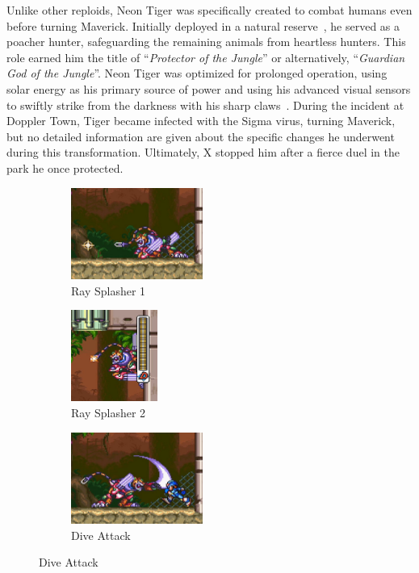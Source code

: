 Unlike other reploids, Neon Tiger was specifically created to combat humans even before turning Maverick. Initially deployed in a natural reserve~\cite{wiki:Neon_tiger}, he served as a poacher hunter, safeguarding the remaining animals from heartless hunters. This role earned him the title of ``\textit{Protector of the Jungle}''\cite{book:MMX_Complete_art} or alternatively, ``\textit{Guardian God of the Jungle}''\cite{wayback:X3_resources}. Neon Tiger was optimized for prolonged operation, using solar energy as his primary source of power and using his advanced visual sensors to swiftly strike from the darkness with his sharp claws~\cite{wayback:X3_resources,Xcoll1:Manual_X3}. During the incident at Doppler Town, Tiger became infected with the Sigma virus, turning Maverick, but  no detailed information are given about the specific changes he underwent during this transformation. Ultimately, X stopped him after a fierce duel in the park he once protected.
\begin{figure}[htp]
	\centering
	\begin{subfigure}{.4\linewidth}
		\centering
		\includegraphics[height=3cm]{figures/X3/Neon_tiger/tiger_ray.jpg}
		\caption{Ray Splasher 1}
	\end{subfigure}
	\begin{subfigure}{.3\linewidth}
		\centering
		\includegraphics[height=3cm]{figures/X3/Neon_tiger/tiger_ray_wall.jpg}
		\caption{Ray Splasher 2}
	\end{subfigure}
	\begin{subfigure}{.4\linewidth}
		\centering
		\includegraphics[height=3cm]{figures/X3/Neon_tiger/tiger_claw.jpg}
		\caption{Dive Attack}
	\end{subfigure}
\end{figure}

